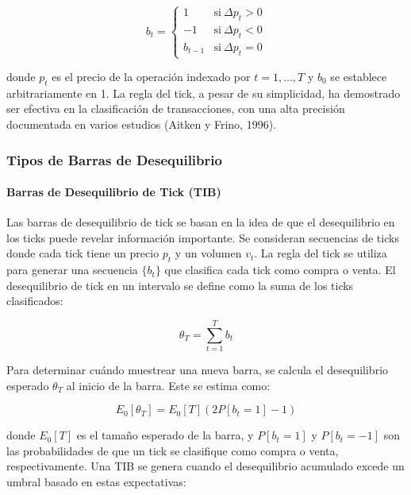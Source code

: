 \documentclass[a4paper,12pt, twoside]{report}
\begin{document}
\begin{equation}
b_t =
\begin{cases}
1 & \text{si} \ \Delta p_t > 0 \\
-1 & \text{si} \ \Delta p_t < 0 \\
b_{t-1} & \text{si} \ \Delta p_t = 0
\end{cases}
\end{equation}

donde \(p_t\) es el precio de la operación indexado por \(t = 1,\ldots,T\) y \(b_0\) se establece arbitrariamente en 1. 
La regla del tick, a pesar de su simplicidad, ha demostrado ser efectiva en la clasificación de transacciones, con una 
alta precisión documentada en varios estudios (Aitken y Frino, 1996).

\subsubsection{Tipos de Barras de Desequilibrio}

\paragraph{Barras de Desequilibrio de Tick (TIB)}

Las barras de desequilibrio de tick se basan en la idea de que el desequilibrio en los ticks puede revelar información 
importante. Se consideran secuencias de ticks donde cada tick tiene un precio \(p_t\) y un volumen \(v_t\). La regla del tick 
se utiliza para generar una secuencia \(\{b_t\}\) que clasifica cada tick como compra o venta. El desequilibrio de tick en un 
intervalo se define como la suma de los ticks clasificados:

\begin{equation}
\theta_T = \sum_{t=1}^{T} b_t
\end{equation}

Para determinar cuándo muestrear una nueva barra, se calcula el desequilibrio esperado \(\theta_T\) al inicio de la barra. 
Este se estima como:

\begin{equation}
E_0[\theta_T] = E_0[T](2P[b_t = 1] - 1)
\end{equation}

donde \(E_0[T]\) es el tamaño esperado de la barra, y \(P[b_t = 1]\) y \(P[b_t = -1]\) son las probabilidades de que un tick 
se clasifique como compra o venta, respectivamente. Una TIB se genera cuando el desequilibrio acumulado excede un umbral basado 
en estas expectativas:
\end{document}
